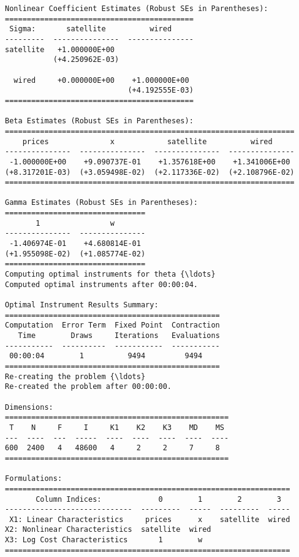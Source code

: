 \begin{Verbatim}[commandchars=\\\{\}]
Nonlinear Coefficient Estimates (Robust SEs in Parentheses):
===========================================
 Sigma:       satellite          wired
---------  ---------------  ---------------
satellite   +1.000000E+00
           (+4.250962E-03)

  wired     +0.000000E+00    +1.000000E+00
                            (+4.192555E-03)
===========================================

Beta Estimates (Robust SEs in Parentheses):
==================================================================
    prices              x            satellite          wired
---------------  ---------------  ---------------  ---------------
 -1.000000E+00    +9.090737E-01    +1.357618E+00    +1.341006E+00
(+8.317201E-03)  (+3.059498E-02)  (+2.117336E-02)  (+2.108796E-02)
==================================================================

Gamma Estimates (Robust SEs in Parentheses):
================================
       1                w
---------------  ---------------
 -1.406974E-01    +4.680814E-01
(+1.955098E-02)  (+1.085774E-02)
================================
Computing optimal instruments for theta {\ldots}
Computed optimal instruments after 00:00:04.

Optimal Instrument Results Summary:
=================================================
Computation  Error Term  Fixed Point  Contraction
   Time        Draws     Iterations   Evaluations
-----------  ----------  -----------  -----------
 00:00:04        1          9494         9494
=================================================
Re-creating the problem {\ldots}
Re-created the problem after 00:00:00.

Dimensions:
===================================================
 T    N     F     I     K1    K2    K3    MD    MS
---  ----  ---  -----  ----  ----  ----  ----  ----
600  2400   4   48600   4     2     2     7     8
===================================================

Formulations:
=================================================================
       Column Indices:             0        1        2        3
-----------------------------  ---------  -----  ---------  -----
 X1: Linear Characteristics     prices      x    satellite  wired
X2: Nonlinear Characteristics  satellite  wired
X3: Log Cost Characteristics       1        w
=================================================================
    \end{Verbatim}

